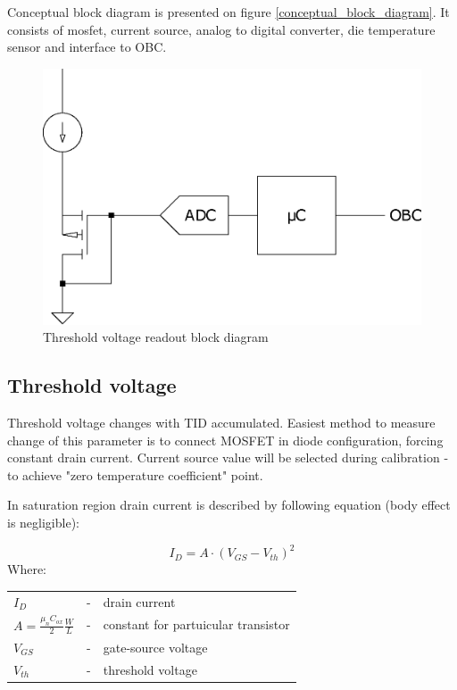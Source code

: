     Conceptual block diagram is presented on figure \ref{conceptual_block_diagram}. It consists of mosfet, current source, analog to digital converter, die temperature sensor and interface to OBC.

    \begin{figure}[H]
        \centering
        \includegraphics[width=0.3\paperwidth]{img/conceptual_block_diagram.eps}
        \caption{Threshold voltage readout block diagram}
    \end{figure}

    \subsection{Threshold voltage}
        Threshold voltage changes with TID accumulated. Easiest method to measure change of this parameter is to connect MOSFET in diode configuration, forcing constant drain current. Current source value will be selected during calibration - to achieve "zero temperature coefficient" point.

        In saturation region drain current is described by following equation (body effect is negligible):

        $$I_D = A \cdot (V_{GS} - V_{th})^2$$
        Where:

        \begin{tabular}{lcl}
            $I_D$ & - & drain current \\
            $A = \frac{\mu_n C_{ox}}{2} \frac{W}{L}$ & - & constant for partuicular transistor \\
            $V_{GS}$ & - & gate-source voltage \\
            $V_{th}$ & - & threshold voltage \\
        \end{tabular}
        \bigskip

